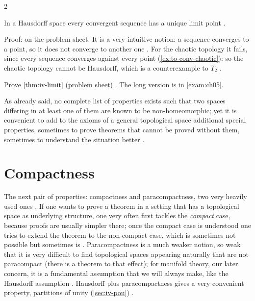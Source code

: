 \begin{paracol}{2}
\begin{theorem}\label{thm:iv-limit}
In a Hausdorff space every convergent sequence has a unique limit point .
\end{theorem}
Proof: on the problem sheet. It is a very intuitive notion: a sequence converges to a point, so it does not converge to another one
. For the chaotic topology it fails, since every sequence converges against every point (\cref{ex:to-conv-chaotic}): so the
chaotic topology cannot be Hausdorff, which is a counterexample to $T_2$ .
\begin{exercise}\label{ex:iv-limit}
Prove \cref{thm:iv-limit} (problem sheet) . The long version is in \cref{exam:ch05}.
\end{exercise}

As already said, no complete list of properties exists such that two spaces differing in at least one of them are known to be non-homeomorphic;
yet it is convenient to add to the axioms of a general topological space additional special properties, sometimes to prove theorems that cannot
be proved without them, sometimes to understand the situation better .

\section{Compactness}\label{sec:iv-compact}

The next pair of properties: compactness and paracompactness, two very heavily used ones . If one wants to prove a theorem in a setting
that has a topological space as underlying structure, one very often first tackles the \emph{compact} case, because proofs are usually simpler there; once
the compact case is understood one tries to extend the theorem to the non-compact case, which is sometimes not possible but sometimes is .
Paracompactness is a much weaker notion, so weak that it is very difficult to find topological spaces appearing naturally that are not paracompact
(there is a theorem to that effect); for manifold theory, our later concern, it is a fundamental assumption that we will always make, like the Hausdorff
assumption . Hausdorff plus paracompactness gives a very convenient property, partitions of unity
(\cref{sec:iv-pou}) .


\end{paracol}
